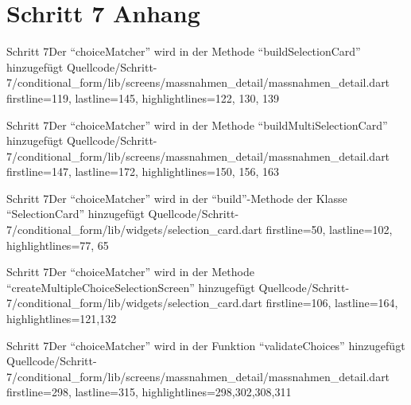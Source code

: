 \chapter{Schritt 7 Anhang}
\label{appendix:Schritt7Anhang}


\begin{alexlisting}{Schritt 7}{Der \enquote{choiceMatcher} wird in der Methode \enquote{buildSelectionCard} hinzugefügt}
    {Quellcode/Schritt-7/conditional_form/lib/screens/massnahmen_detail/massnahmen_detail.dart}
    {firstline=119, lastline=145, highlightlines={122, 130, 139}}
    \label{lst:Schritt7AppendixbuildSelectionCard}
\end{alexlisting}


\begin{alexlisting}{Schritt 7}{Der \enquote{choiceMatcher} wird in der Methode \enquote{buildMultiSelectionCard} hinzugefügt}
    {Quellcode/Schritt-7/conditional_form/lib/screens/massnahmen_detail/massnahmen_detail.dart}
    {firstline=147, lastline=172, highlightlines={150, 156, 163}}
    \label{lst:Schritt7buildMultiSelectionCard}
\end{alexlisting}


\begin{alexlisting}{Schritt 7}{Der \enquote{choiceMatcher} wird in der \enquote{build}-Methode der Klasse \enquote{SelectionCard} hinzugefügt}
    {Quellcode/Schritt-7/conditional_form/lib/widgets/selection_card.dart}
    {firstline=50, lastline=102, highlightlines={77, 65}}
    \label{lst:Schritt7validityChangedStreamBuilderChoiceMatcher}
\end{alexlisting}



\begin{alexlisting}{Schritt 7}{Der \enquote{choiceMatcher} wird in der Methode \enquote{createMultipleChoiceSelectionScreen} hinzugefügt}
    {Quellcode/Schritt-7/conditional_form/lib/widgets/selection_card.dart}
    {firstline=106, lastline=164, highlightlines={121,132}}
    \label{lst:Schritt7createMultipleChoiceSelectionScreenChoiceMatcher}
\end{alexlisting}
 
\begin{alexlisting}{Schritt 7}{Der \enquote{choiceMatcher} wird in der Funktion \enquote{validateChoices} hinzugefügt}
    {Quellcode/Schritt-7/conditional_form/lib/screens/massnahmen_detail/massnahmen_detail.dart}
    {firstline=298, lastline=315, highlightlines={298,302,308,311}}
    \label{lst:Schritt7validateChoices}
\end{alexlisting}